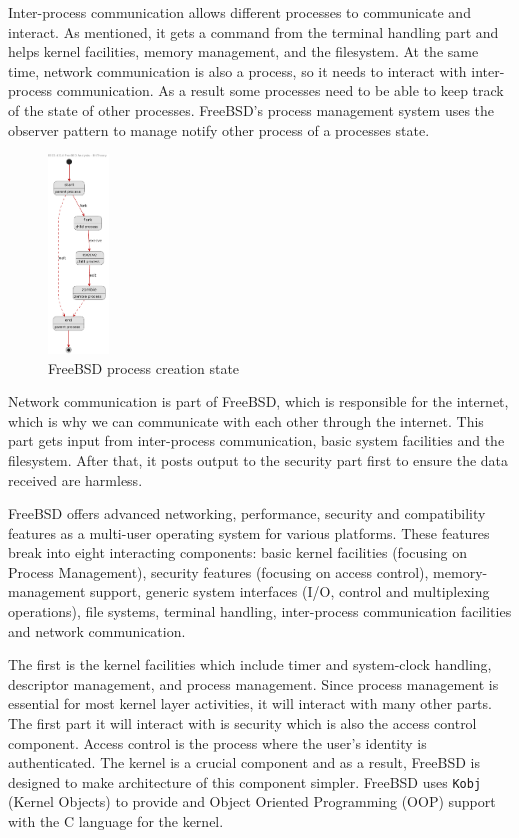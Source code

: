 \documentclass[12pt, dvipsnames, a4paper]{article}
\newcommand{\code}[1]{\texttt{#1}}
\begin{document}
Inter-process communication allows different processes to communicate and interact. As mentioned, it gets a command from the terminal handling part and helps kernel facilities, memory management, and the filesystem. At the same time, network communication is also a process, so it needs to interact with inter-process communication. As a result some processes need to be able to keep track of the state of other processes. FreeBSD's process management system uses the observer pattern to manage notify other process of a processes state.
\begin{figure}[!htb]
	\centering
	\includegraphics[width = 46pt]{assets/state_diagrams/process-state.pdf}
	\caption{FreeBSD process creation state}
\end{figure}

Network communication is part of FreeBSD, which is responsible for the internet, which is why we can communicate with each other through the internet. This part gets input from inter-process communication, basic system facilities and the filesystem. After that, it posts output to the security part first to ensure the data received are harmless.

FreeBSD offers advanced networking, performance, security and compatibility features as a multi-user operating system for various platforms. These features break into eight interacting components: basic kernel facilities (focusing on Process Management), security features
(focusing on access control), memory-management support, generic system interfaces (I/O, control and multiplexing operations), file systems, terminal handling, inter-process communication facilities and network communication.

The first is the kernel facilities which include timer and system-clock handling, descriptor management, and process management. Since process management is essential for most kernel layer activities, it will interact with many other parts. The first part it will interact with
is security which is also the access control component. Access control is the process where the user's identity is authenticated. The kernel is a crucial component and as a result, FreeBSD is designed to make architecture of this component simpler. FreeBSD uses \code{Kobj} (Kernel Objects) to provide and Object Oriented Programming (OOP) support with the C language for the kernel.
\end{document}
